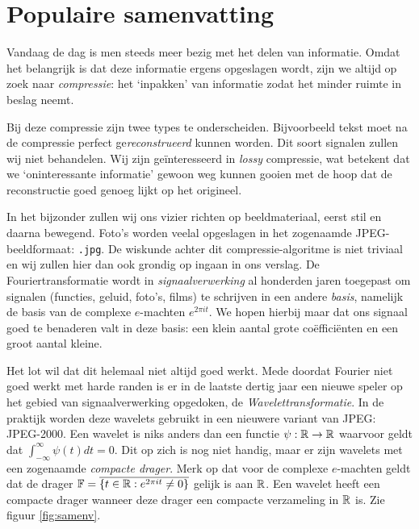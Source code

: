 \chapter{Populaire samenvatting}

Vandaag de dag is men steeds meer bezig met het delen van informatie. Omdat het belangrijk is dat deze informatie ergens opgeslagen wordt, zijn we altijd op zoek naar \emph{compressie}: het `inpakken' van informatie zodat het minder ruimte in beslag neemt.

Bij deze compressie zijn twee types te onderscheiden. Bijvoorbeeld tekst moet na de compressie perfect ge\emph{reconstrueerd} kunnen worden. Dit soort signalen zullen wij niet behandelen. Wij zijn ge\"interesseerd in \emph{lossy} compressie, wat betekent dat we `oninteressante informatie' gewoon weg kunnen gooien met de hoop dat de reconstructie goed genoeg lijkt op het origineel.

In het bijzonder zullen wij ons vizier richten op beeldmateriaal, eerst stil en daarna bewegend. Foto's worden veelal opgeslagen in het zogenaamde JPEG-beeldformaat: \texttt{.jpg}. De wiskunde achter dit compressie-algoritme is niet triviaal en wij zullen hier dan ook grondig op ingaan in ons verslag. De Fouriertransformatie wordt in \emph{signaalverwerking} al honderden jaren toegepast om signalen (functies, geluid, foto's, films) te schrijven in een andere \emph{basis}, namelijk de basis van de complexe $e$-machten $e^{2 \pi i t}$. We hopen hierbij maar dat ons signaal goed te benaderen valt in deze basis: een klein aantal grote co\"effici\"enten en een groot aantal kleine.

Het lot wil dat dit helemaal niet altijd goed werkt. Mede doordat Fourier niet goed werkt met harde randen is er in de laatste dertig jaar een nieuwe speler op het gebied van signaalverwerking opgedoken, de \mbox{\emph{Wavelettransformatie}}. In de praktijk worden deze wavelets gebruikt in een nieuwere variant van JPEG: JPEG-2000. Een wavelet is niks anders dan een functie $\psi: \mathbb{R} \to \mathbb{R}$ waarvoor geldt dat $\int_{-\infty}^\infty \psi(t) dt = 0$. Dit op zich is nog niet handig, maar er zijn wavelets met een zogenaamde \emph{compacte drager}. Merk op dat voor de complexe $e$-machten geldt dat de drager $\mathbb{F} = \overline{\{ t \in \mathbb{R}: e^{2 \pi i t} \not= 0 \}}$ gelijk is aan $\mathbb{R}$. Een wavelet heeft een compacte drager wanneer deze drager een compacte verzameling in $\mathbb{R}$ is. Zie figuur \ref{fig:samenv}.

